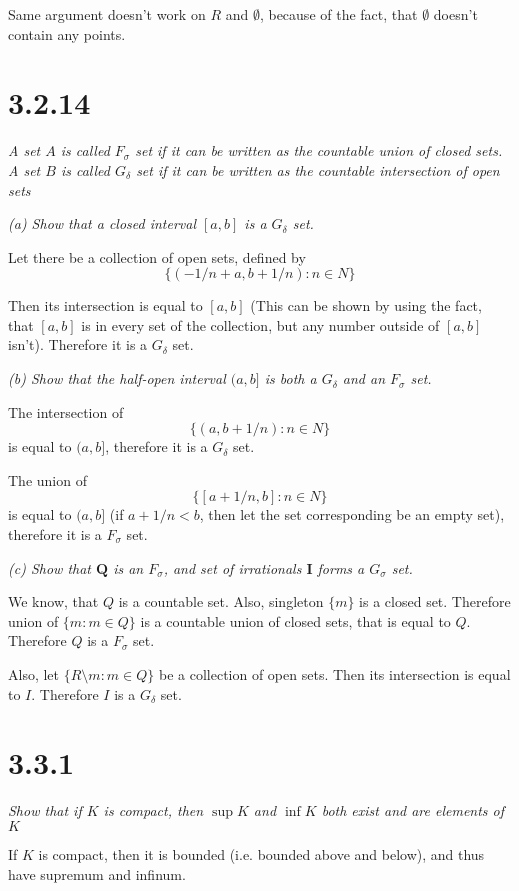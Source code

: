 \documentclass[11pt,oneside,titlepage]{article}
\begin{document}
Same argument doesn't work on $R$ and $\emptyset$, because of the fact,
that $\emptyset$ doesn't contain any points.

\section*{3.2.14}
\textit{A set $A$ is called $F_\sigma$ set if it can be written as the
  countable union of closed sets. A set $B$ is called $G_\delta$ set if it
  can be written as the countable intersection of open sets}

\textit{(a) Show that a closed interval $[a,b]$ is a $G_\delta$ set.}

Let there be a collection of open sets, defined by
$$\{(-1/n + a, b + 1/n): n \in N\}$$

Then its intersection is equal to $[a,b]$ (This can be shown by using the fact, that
$[a,b]$ is in every set of the  collection, but any number outside of $[a,b]$
isn't). Therefore it is a $G_\delta$ set.

\textit{(b) Show that the half-open interval $(a,b]$ is both a $G_\delta$ and
  an $F_\sigma$ set.}

The intersection of
$$\{(a, b + 1/n): n \in N\}$$
is equal to $(a, b]$, therefore it is a $G_\delta$ set.

The union of
$$\{[a + 1/n, b]: n \in N\}$$
is equal to $(a, b]$ (if  $a + 1/n < b$, then let the set corresponding be an
empty set), therefore it is a $F_\sigma$ set.

\textit{(c) Show that $\textbf{Q}$ is an $F_\sigma$, and set of irrationals
  $\textbf{I}$ forms a $G_\sigma$ set.}

We know, that $Q$ is a countable set. Also, singleton $\{m\}$ is a closed set.
Therefore union of 
$\{m: m \in Q\}$
is a countable union of closed sets, that is equal to $Q$. Therefore $Q$ is a
$F_\sigma$ set.

Also, let
$\{R \setminus m: m \in Q\}$
be a collection of open sets. Then its intersection is equal to $I$.
Therefore $I$ is a $G_\delta$ set.

\section*{3.3.1}
\textit{Show that if $K$ is compact, then $\sup K$ and $\inf K$ both exist
  and are elements of $K$}

If $K$ is compact, then it is bounded (i.e. bounded above and below), and
thus have supremum and infinum.
\end{document}
